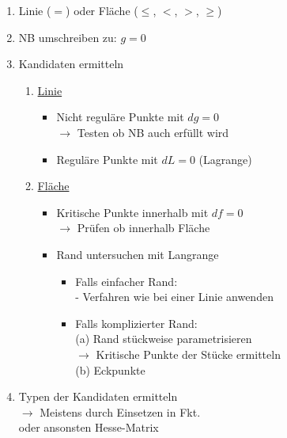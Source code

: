 \documentclass[6pt]{article}
\begin{document}
\begin{multicols*}{3}
		\begin{enumerate}[label=(\roman*), itemsep=2pt, parsep=2pt]
			\item Linie ($=$) oder Fl{\"a}che ($\leq$, $<$, $>$, $\geq$)	
			\item NB umschreiben zu: $g=0$
			\item Kandidaten ermitteln
						\begin{enumerate}[ itemsep=2pt, parsep=2pt]
							\item \underline{Linie} \\
									\vspace{-3mm}
									\begin{itemize}
											\item 	Nicht regul{\"a}re Punkte mit $dg=0$ \\
														$\rightarrow$ Testen ob NB auch erf{\"u}llt wird
											\item 	Regul{\"a}re Punkte mit $dL=0$ (Lagrange)
									\end{itemize}
									\vspace{1mm}
							\item \underline{Fl{\"ache}}\\
									\vspace{-3mm}
									\begin{itemize}
											\item 	Kritische Punkte innerhalb mit $df=0$ \\
														$\rightarrow$ Pr{\"u}fen ob innerhalb Fl{\"a}che
											\item 	Rand untersuchen mit Langrange \\
														\vspace{-3mm}
														\begin{itemize}
																\item Falls einfacher Rand: \\
																		- Verfahren wie bei einer Linie anwenden
																\item Falls komplizierter Rand: \\
																		(a) Rand st{\"u}ckweise parametrisieren \\
																		$\rightarrow$ Kritische Punkte der St{\"u}cke ermitteln \\
																		(b) Eckpunkte
														\end{itemize}
									\end{itemize}	
						\end{enumerate}	
			\item 	Typen der Kandidaten ermitteln \\
						$\rightarrow $ Meistens durch Einsetzen in Fkt. \\
						oder ansonsten Hesse-Matrix
		\end{enumerate}


\end{multicols*}
\end{document}
